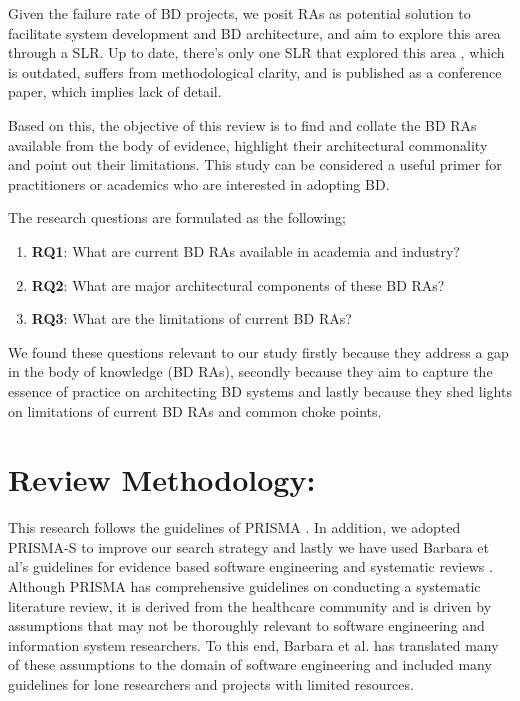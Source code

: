 \documentclass{ieeeaccess}
\begin{document}
Given the failure rate of BD projects, we posit RAs as potential solution to facilitate system development and BD architecture, and aim to explore this area through a SLR. Up to date, there's only one SLR that explored this area \cite{AtaeiACIS}, which is outdated, suffers from methodological clarity, and is published as a conference paper, which implies lack of detail.

Based on this, the objective of this review is to find and collate the BD RAs available from the body of evidence, highlight their architectural commonality and point out their limitations. This study can be considered a useful primer for practitioners or academics who are interested in adopting BD. 

The research questions are formulated as the following; 
\begin{enumerate}
    \item \textbf{RQ1}: What are current BD RAs available in academia and industry?
    \item \textbf{RQ2}: What are major architectural components of these BD RAs? 
    \item \textbf{RQ3}: What are the limitations of current BD RAs?
\end{enumerate}

We found these questions relevant to our study firstly because they address a gap in the body of knowledge (BD RAs), secondly because they aim to capture the essence of practice on architecting BD systems and lastly because they shed lights on limitations of current BD RAs and common choke points. 

\section{Review Methodology:}
This research follows the guidelines of PRISMA \cite{page2021prisma}. In addition, we adopted PRISMA-S \cite{rethlefsen2021prisma} to improve our search strategy and lastly we have used Barbara et al's guidelines for evidence based software engineering and systematic reviews \cite{kitchenham2015evidence}. Although PRISMA has comprehensive guidelines on conducting a systematic literature review, it is derived from the healthcare community and is driven by assumptions that may not be thoroughly relevant to software engineering and information system researchers. To this end, Barbara et al. \cite{kitchenham2015evidence} has translated many of these assumptions to the domain of software engineering and included many guidelines for lone researchers and projects with limited resources.
\end{document}
